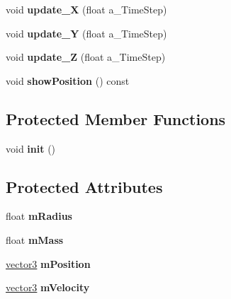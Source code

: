 \begin{DoxyCompactItemize}
\item 
void {\bfseries update\+\_\+X} (float a\+\_\+\+Time\+Step)\hypertarget{classns__phys_1_1_game_object_a934ca7196dbe29da1b5e0a0d6934c971}{}\label{classns__phys_1_1_game_object_a934ca7196dbe29da1b5e0a0d6934c971}

\item 
void {\bfseries update\+\_\+Y} (float a\+\_\+\+Time\+Step)\hypertarget{classns__phys_1_1_game_object_a34a486a39cb3bf695f1ea01a199e11df}{}\label{classns__phys_1_1_game_object_a34a486a39cb3bf695f1ea01a199e11df}

\item 
void {\bfseries update\+\_\+Z} (float a\+\_\+\+Time\+Step)\hypertarget{classns__phys_1_1_game_object_a4afbce642db5635cd4f56975e0b12065}{}\label{classns__phys_1_1_game_object_a4afbce642db5635cd4f56975e0b12065}

\item 
void {\bfseries show\+Position} () const \hypertarget{classns__phys_1_1_game_object_a94c184ee288d4e602e94121065b616fb}{}\label{classns__phys_1_1_game_object_a94c184ee288d4e602e94121065b616fb}

\end{DoxyCompactItemize}
\subsection*{Protected Member Functions}
\begin{DoxyCompactItemize}
\item 
void {\bfseries init} ()\hypertarget{classns__phys_1_1_game_object_a6c89b027506f2e7dc96f71c68edac3a7}{}\label{classns__phys_1_1_game_object_a6c89b027506f2e7dc96f71c68edac3a7}

\end{DoxyCompactItemize}
\subsection*{Protected Attributes}
\begin{DoxyCompactItemize}
\item 
float {\bfseries m\+Radius}\hypertarget{classns__phys_1_1_game_object_a3e9f0acf625c0384c228179912e52225}{}\label{classns__phys_1_1_game_object_a3e9f0acf625c0384c228179912e52225}

\item 
float {\bfseries m\+Mass}\hypertarget{classns__phys_1_1_game_object_a82160260b62cc5e0623f60449047a281}{}\label{classns__phys_1_1_game_object_a82160260b62cc5e0623f60449047a281}

\item 
\hyperlink{classns__phys_1_1vector3}{vector3} {\bfseries m\+Position}\hypertarget{classns__phys_1_1_game_object_a50cb157eeef441a212a91e2ad2efaafa}{}\label{classns__phys_1_1_game_object_a50cb157eeef441a212a91e2ad2efaafa}

\item 
\hyperlink{classns__phys_1_1vector3}{vector3} {\bfseries m\+Velocity}\hypertarget{classns__phys_1_1_game_object_af751ad334953d3e72a38af338f9f60f6}{}\label{classns__phys_1_1_game_object_af751ad334953d3e72a38af338f9f60f6}

\end{DoxyCompactItemize}


